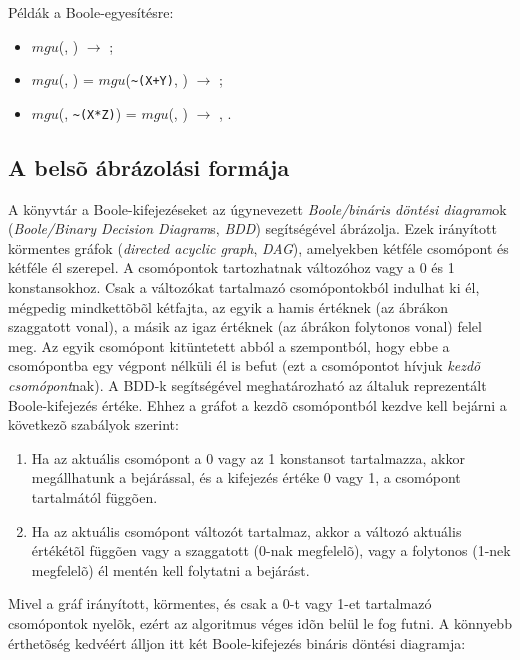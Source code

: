 Példák a Boole-egyesítésre:

\begin{itemize}
\item $mgu$(, ) $\longrightarrow$ ;
\item $mgu$(, ) = $mgu$(\verb'~(X+Y)', )
$\longrightarrow$ ;
\item $mgu$(, \verb'~(X*Z)') = $mgu$(, )
$\longrightarrow$ , .
\end{itemize}

\subsection{A \clpb belsõ ábrázolási formája}

A \clpb könyvtár a Boole-kifejezéseket az úgynevezett \emph{Boole/bináris
döntési diagram}ok (\emph{Boole/Binary Decision Diagram}s, \emph{BDD})
segítségével ábrázolja. Ezek irányított körmentes gráfok (\emph{directed
acyclic graph}, \emph{DAG}), amelyekben kétféle csomópont és kétféle él
szerepel. A csomópontok tartozhatnak változóhoz vagy a 0 és 1 konstansokhoz.
Csak a változókat tartalmazó csomópontokból indulhat ki él, mégpedig
mindkettõbõl kétfajta, az egyik a hamis értéknek (az ábrákon szaggatott vonal),
a másik az igaz értéknek (az ábrákon folytonos vonal) felel meg. Az egyik
csomópont kitüntetett abból a szempontból, hogy ebbe a csomópontba egy
végpont nélküli él is befut (ezt a csomópontot hívjuk \emph{kezdõ csomópont}nak).
A BDD-k segítségével meghatározható az általuk reprezentált Boole-kifejezés
értéke. Ehhez a gráfot a kezdõ csomópontból kezdve kell bejárni a
következõ szabályok szerint:

\begin{enumerate}
\item Ha az aktuális csomópont a 0 vagy az 1 konstansot tartalmazza, akkor
megállhatunk a bejárással, és a kifejezés értéke 0 vagy 1, a csomópont
tartalmától függõen.
\item Ha az aktuális csomópont változót tartalmaz, akkor a változó aktuális
értékétõl függõen vagy a szaggatott (0-nak megfelelõ), vagy a folytonos
(1-nek megfelelõ) él mentén kell folytatni a bejárást.
\end{enumerate}

Mivel a gráf irányított, körmentes, és csak a 0-t vagy 1-et tartalmazó
csomópontok nyelõk, ezért az algoritmus véges idõn belül le fog futni.
A könnyebb érthetõség kedvéért álljon itt két Boole-kifejezés bináris döntési
diagramja:

